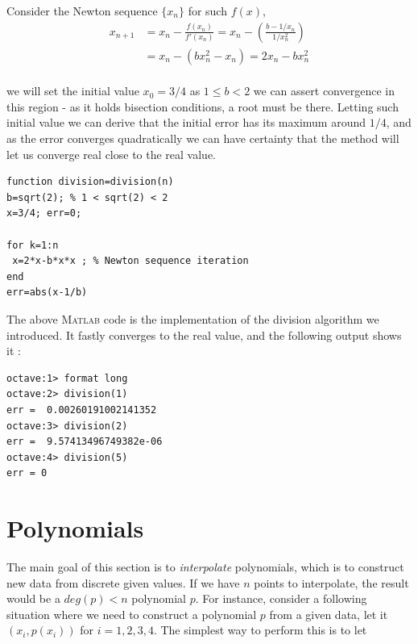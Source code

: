 \documentclass[paper=a4, fontsize=11pt]{scrartcl}
\newcommand{\MATLAB}{\textsc{Matlab}\xspace}
\begin{document}
Consider the Newton sequence $\{x_n\}$ for such $f(x)$, \\

\begin{equation}\nonumber
\begin{split}
		x_{n+1} &= x_n - \frac{f(x_n)}{f'(x_n)} = x_n - \left( \frac{b- 1/x_n}{1/x_n^2}\right) \\[1.5ex]
		&= x_n - (bx_n^2 -x_n) = 2x_n - bx_n^2
\end{split}
\end{equation}\\

we will set the initial value $x_0=3/4$ as $1\leq b <2$ we can assert convergence in this region - as it holds bisection conditions, a root must be there. Letting such initial value we can derive that the initial error has its maximum around $1/4$, and as the error converges quadratically we can have certainty that the method will let us converge real close to the real value.

\vspace{0.15in}
\begin{lstlisting}[caption=division.m]
function division=division(n) 
b=sqrt(2); % 1 < sqrt(2) < 2
x=3/4; err=0;

for k=1:n
 x=2*x-b*x*x ; % Newton sequence iteration
end
err=abs(x-1/b)
\end{lstlisting}
\vspace{0.15in}

The above \MATLAB code is the implementation of the division algorithm we introduced. It fastly converges to the real value, and the following output shows it :

\begin{verbatim}
octave:1> format long
octave:2> division(1)
err =  0.00260191002141352
octave:3> division(2)
err =  9.57413496749382e-06
octave:4> division(5)
err = 0
\end{verbatim}

\vspace{0.15in}

\section{Polynomials}
\vspace{0.25in}

The main goal of this section is to \textit{interpolate} polynomials, which is to construct new data from discrete given values. If we have $n$ points to interpolate, the result would be a $deg(p) < n$ polynomial $p$. For instance, consider a following situation where we need to construct a polynomial $p$ from a given data, let it $(x_i,p(x_i))$ for $i=1,2,3,4$. The simplest way to perform this is to let \\
\end{document}

